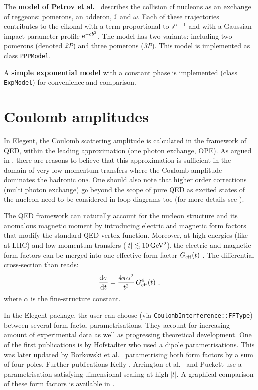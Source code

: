 \documentclass[preprint,12pt]{elsarticle}
\def\class#1{{\tt #1}}
\def\e{{\rm e}}
\def\d{{\rm d}}
\def\un#1{{\,\rm #1}}
\begin{document}
The {\bf model of Petrov et al.}~\cite{petrov02} describes the collision of nucleons as an exchange of reggeons: pomerons, an odderon, $\rm f$ and $\omega$. Each of these trajectories contributes to the eikonal with a term proportional to $s^{\alpha - 1}$ and with a Gaussian impact-parameter profile $\e^{-c b^2}$. The model has two variants: including two pomerons (denoted {\em 2P}\/) and three pomerons ({\em 3P}\/). This model is implemented as class \class{PPPModel}.

A {\bf simple exponential model} with a constant phase is implemented (class \class{ExpModel}) for convenience and comparison.



\section{Coulomb amplitudes}\label{s:coul mod}

In Elegent, the Coulomb scattering amplitude is calculated in the framework of QED, within the leading approximation (one photon exchange, OPE). As argued in \cite[section 1.3.6]{jan_thesis}, there are reasons to believe that this approximation is sufficient in the domain of very low momentum transfers where the Coulomb amplitude dominates the hadronic one. One should also note that higher order corrections (multi photon exchange) go beyond the scope of pure QED as excited states of the nucleon need to be considered in loop diagrams too (for more details see \cite{arrington07,puckett10}).

The QED framework can naturally account for the nucleon structure and its anomalous magnetic moment by introducing electric and magnetic form factors that modify the standard QED vertex function. Moreover, at high energies (like at LHC) and low momentum transfers ($|t| \lesssim 10\un{GeV^2}$), the electric and magnetic form factors can be merged into one effective form factor $G_{\rm eff}(t)$ \cite[equation (31)]{block06}. The differential cross-section than reads:
\begin{equation}
{\d\sigma\over\d t} = {4\pi \alpha^2\over t^2}\, G_{\rm eff}^4(t)\ ,
\end{equation}
where $\alpha$ is the fine-structure constant.

In the Elegent package, the user can choose (via {\tt CoulombInterference::\discretionary{}{}{}FFType}) between several form factor parametrisations. They account for increasing amount of experimental data as well as progressing theoretical development. One of the first publications is by Hofstadter \cite{hofstadter58} who used a dipole parametrisations. This was later updated by Borkowski et al.~\cite{borkowski74,borkowski75} parametrising both form factors by a sum of four poles. Further publications Kelly \cite{kelly04}, Arrington et al.~\cite{arrington07} and Puckett \cite{puckett10} use a parametrisation satisfying dimensional scaling at high $|t|$. A graphical comparison of these form factors is available in \cite[Figure~1.7]{jan_thesis}.
\end{document}
